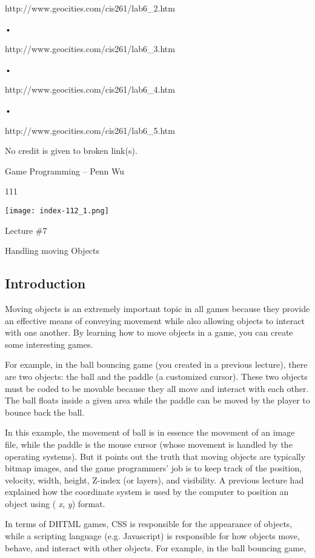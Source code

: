 \documentclass[
]{article}
\begin{document}
http://www.geocities.com/cis261/lab6\_2.htm

•

http://www.geocities.com/cis261/lab6\_3.htm

•

http://www.geocities.com/cis261/lab6\_4.htm

•

http://www.geocities.com/cis261/lab6\_5.htm

No credit is given to broken link(s).

Game Programming -- Penn Wu

111

\protect\hypertarget{index_split_007.htmlux5cux23p112}{}{}\texttt{[image: index-112\_1.png]}

Lecture \#7

Handling moving Objects

\protect\hypertarget{index_split_008.html}{}{}

\hypertarget{index_split_008.htmlux5cux23calibre_pb_7}{%
\subsection{Introduction}\label{index_split_008.htmlux5cux23calibre_pb_7}}

Moving objects is an extremely important topic in all games because they
provide an effective means of conveying movement while also allowing
objects to interact with one another. By learning how to move objects in
a game, you can create some interesting games.

For example, in the ball bouncing game (you created in a previous
lecture), there are two objects: the ball and the paddle (a customized
cursor). These two objects must be coded to be movable because they all
move and interact with each other. The ball floats inside a given area
while the paddle can be moved by the player to bounce back the ball.

In this example, the movement of ball is in essence the movement of an
image file, while the paddle is the mouse cursor (whose movement is
handled by the operating systems). But it points out the truth that
moving objects are typically bitmap images, and the game programmers'
job is to keep track of the position, velocity, width, height, Z-index
(or layers), and visibility. A previous lecture had explained how the
coordinate system is used by the computer to position an object using (
\emph{x}, \emph{y}) format.

In terms of DHTML games, CSS is responsible for the appearance of
objects, while a scripting language (e.g. Javascript) is responsible for
how objects move, behave, and interact with other objects. For example,
in the ball bouncing game,
\end{document}
